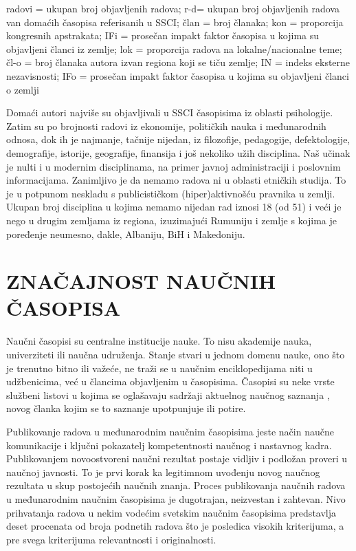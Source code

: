 \documentclass[12pt,a4paper]{article}
\begin{document}
    \qquad

    
    radovi = ukupan broj objavljenih radova; r-d= ukupan broj objavljenih radova van domaćih časopisa referisanih u SSCI; član = broj članaka; kon = proporcija kongresnih apstrakata; IFi = prosečan impakt faktor časopisa u kojima su objavljeni članci iz zemlje; lok = proporcija radova na lokalne/nacionalne teme; čl-o = broj članaka autora izvan regiona koji se tiču zemlje; IN = indeks eksterne nezavisnosti; IFo = prosečan impakt faktor časopisa u kojima su objavljeni članci o zemlji 

    \qquad
      Domaći autori najviše su objavljivali u SSCI časopisima iz oblasti psihologije. Zatim su po brojnosti radovi iz ekonomije, političkih nauka i međunarodnih odnosa, dok ih je najmanje, tačnije nijedan, iz filozofije, pedagogije, defektologije, demografije, istorije, geografije, finansija i još nekoliko užih disciplina. Naš učinak je nulti i u modernim disciplinama, na primer javnoj administraciji i poslovnim informacijama. Zanimljivo je da nemamo radova ni u oblasti etničkih studija. To je u potpunom neskladu s publicističkom (hiper)aktivnošću pravnika u zemlji. Ukupan broj disciplina u kojima nemamo nijedan rad iznosi 18 (od 51) i veći je nego u drugim zemljama iz regiona, izuzimajući Rumuniju i zemlje s kojima je poređenje neumesno, dakle, Albaniju, BiH i Makedoniju. 


    \section{\large\textbf{ZNAČAJNOST NAUČNIH ČASOPISA}}
    \indent
    
     Naučni časopisi su centralne institucije nauke. To nisu akademije nauka, univerziteti ili naučna udruženja. Stanje stvari u jednom domenu nauke, ono što je trenutno bitno ili važeće, ne traži se u naučnim enciklopedijama niti u udžbenicima, već u člancima objavljenim u časopisima. Časopisi su neke vrste službeni listovi u kojima se oglašavaju sadržaji aktuelnog naučnog saznanja , novog članka kojim se to saznanje upotpunjuje ili potire. 
   
    Publikovanje radova u međunarodnim naučnim časopisima jeste način naučne komunikacije i ključni pokazatelj kompetentnosti naučnog i nastavnog kadra. Publikovanjem novoostvoreni naučni rezultat postaje vidljiv i podložan proveri u naučnoj javnosti. To je prvi korak ka legitimnom uvođenju novog naučnog rezultata u skup postojećih naučnih znanja. Proces publikovanja naučnih radova u međunarodnim naučnim časopisima je dugotrajan, neizvestan i zahtevan. Nivo prihvatanja radova u nekim vodećim svetskim naučnim časopisima predstavlja deset procenata od broja podnetih radova što je posledica visokih kriterijuma, a pre svega kriterijuma relevantnosti i originalnosti. 
    \qquad
\end{document}
